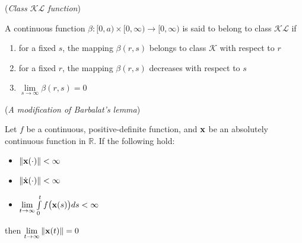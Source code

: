 \begin{definition}\cite{khalil_nonlinear_systems} (\textit{Class $\mathcal{KL}$ function})
\label{def:kl_class}

  A continuous function $\beta : [0, a) \times [0, \infty) \to [0, \infty)$
  is said to belong to class $\mathcal{KL}$ if
  \begin{enumerate}
    \item for a fixed $s$, the mapping $\beta(r,s)$ belongs to class $\mathcal{K}$ with respect to $r$
    \item for a fixed $r$, the mapping $\beta(r,s)$ decreases with respect to $s$
    \item $\lim\limits_{s \to \infty} \beta(r,s) = 0$
\\[2.5ex]
  \end{enumerate}
\end{definition}



  \begin{lemma} \cite{Fontes2007} (\textit{A modification of Barbalat's lemma})
  \label{lemma:barbalat}

    Let $f$ be a continuous, positive-definite function, and $\bm{\mathbf{x}}$ be an
    absolutely continuous function in $\mathbb{R}$. If the following hold:
  \begin{itemize}
    \item $\|\bm{\mathbf{x}}(\cdot)\| < \infty$
    \item $\|\dot{\bm{\mathbf{x}}}(\cdot)\| < \infty$
    \item $\lim\limits_{t \to \infty} \int\limits_0^t f\big(\bm{\mathbf{x}}(s)\big)ds < \infty$
  \end{itemize}
  then $\lim\limits_{t \to \infty} \|\bm{\mathbf{x}}(t)\| = 0$
\\[2.5ex]
  \end{lemma}

